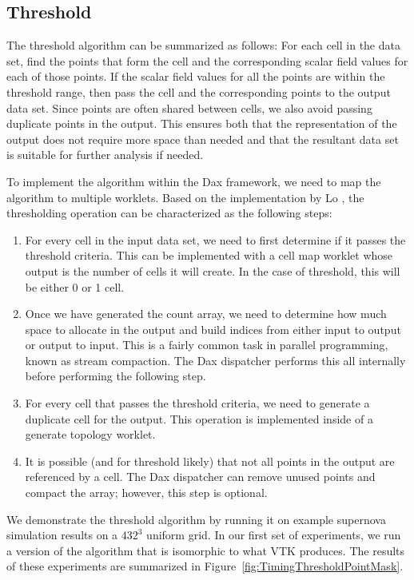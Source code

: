 \subsection{Threshold}

The threshold algorithm can be summarized as follows: For each cell in the
data set, find the points that form the cell and the corresponding scalar
field values for each of those points. If the scalar field values for all
the points are within the threshold range, then pass the cell and the
corresponding points to the output data set. Since points are often shared
between cells, we also avoid passing duplicate points in the output. This
ensures both that the representation of the output does not require more
space than needed and that the resultant data set is suitable for further
analysis if needed.

To implement the algorithm within the Dax framework, we need to map the
algorithm to multiple worklets. Based on the implementation by Lo
\etal{}, the thresholding operation can be characterized as the
following steps:

\begin{enumerate}
\item For every cell in the input data set, we need to first determine if it
  passes the threshold criteria. This can be implemented with a cell map
  worklet whose output is the number of cells it will create. In the case
  of threshold, this will be either 0 or 1 cell.
\item Once we have generated the count array, we need to determine how much
  space to allocate in the output and build indices from either input to
  output or output to input. This is a fairly common task in parallel
  programming, known as stream compaction. The Dax dispatcher performs this
  all internally before performing the following step.
\item For every cell that passes the threshold criteria, we need to
  generate a duplicate cell for the output. This operation is implemented
  inside of a generate topology worklet.
\item It is possible (and for threshold likely) that not all points in the
  output are referenced by a cell. The Dax dispatcher can remove unused
  points and compact the array; however, this step is optional.
\end{enumerate}

We demonstrate the threshold algorithm by running it on example supernova
simulation results on a $432^3$ uniform grid. In our first set of
experiments, we run a version of the algorithm that is isomorphic to what
VTK produces. The results of these experiments are summarized in
Figure~\ref{fig:TimingThresholdPointMask}.

